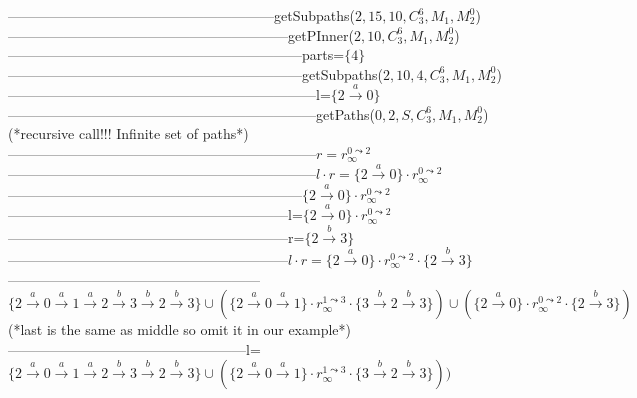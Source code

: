 {---------------------------------------------------------getSubpaths($2,15,10,C_3^6,M_1,M_2^0$)\\
------------------------------------------------------------getPInner($2,10,C_3^6,M_1,M_2^0$)\\
---------------------------------------------------------------parts=$\{4\}$\\
---------------------------------------------------------------getSubpaths($2,10,4,C_3^6,M_1,M_2^0$)\\
------------------------------------------------------------------l=$\{2 \xrightarrow{a} 0\}$\\
------------------------------------------------------------------getPaths($0,2,S,C_3^6,M_1,M_2^0$)(*recursive call!!! Infinite set of paths*)\\
------------------------------------------------------------------$r = r_\infty^{0\leadsto 2}$\\
------------------------------------------------------------------$l \cdot r = \{2 \xrightarrow{a} 0\} \cdot r_\infty^{0\leadsto 2}$\\
---------------------------------------------------------------$\{2 \xrightarrow{a} 0\} \cdot r_\infty^{0\leadsto 2}$\\
------------------------------------------------------------l=$\{2 \xrightarrow{a} 0\} \cdot r_\infty^{0\leadsto 2}$\\
------------------------------------------------------------r=$\{2 \xrightarrow{b} 3\}$\\
------------------------------------------------------------$l \cdot r =\{2 \xrightarrow{a} 0\} \cdot r_\infty^{0\leadsto 2} \cdot \{2 \xrightarrow{b} 3\} $\\
------------------------------------------------------$\{2 \xrightarrow{a} 0 \xrightarrow{a} 1 \xrightarrow{a} 2 \xrightarrow{b} 3 \xrightarrow{b} 2 \xrightarrow{b} 3\} \cup (\{2 \xrightarrow{a} 0 \xrightarrow{a} 1\} \cdot r_\infty^{1\leadsto 3} \cdot \{3 \xrightarrow{b} 2 \xrightarrow{b} 3\}) \cup (\{2 \xrightarrow{a} 0\} \cdot r_\infty^{0\leadsto 2} \cdot \{2 \xrightarrow{b} 3\})$ (*last is the same as middle so omit it in our example*)\\
---------------------------------------------------l=$\{2 \xrightarrow{a} 0 \xrightarrow{a} 1 \xrightarrow{a} 2 \xrightarrow{b} 3 \xrightarrow{b} 2 \xrightarrow{b} 3\} \cup (\{2 \xrightarrow{a} 0 \xrightarrow{a} 1\} \cdot r_\infty^{1\leadsto 3} \cdot \{3 \xrightarrow{b} 2 \xrightarrow{b} 3\}))$\\
}
